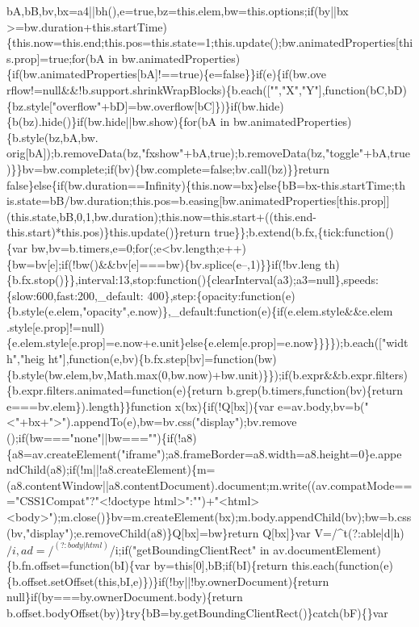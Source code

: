 \begin{DoxyCode}
{       bA,bB,bv,bx=a4||bh(),e=true,bz=this.elem,bw=this.options;if(by||bx
      >=bw.duration+this.startTime)\{this.now=this.end;this.pos=this.state=1;this.update();bw.animatedProperties[this.prop]=true;for(bA in
       bw.animatedProperties)\{if(bw.animatedProperties[bA]!==true)\{e=false\}\}if(e)\{if(bw.ove
      rflow!=null&&!b.support.shrinkWrapBlocks)\{b.each(["","X","Y"],function(bC,bD)\{bz.style["overflow"+bD]=bw.overflow[bC]\})\}if(bw.hide)\{b(bz).hide()\}if(bw.hide||bw.show)\{for(bA in
       bw.animatedProperties)\{b.style(bz,bA,bw.
      orig[bA]);b.removeData(bz,"fxshow"+bA,true);b.removeData(bz,"toggle"+bA,true)\}\}bv=bw.complete;if(bv)\{bw.complete=false;bv.call(bz)\}\}return
       false\}else\{if(bw.duration==Infinity)\{this.now=bx\}else\{bB=bx-this.startTime;th
      is.state=bB/bw.duration;this.pos=b.easing[bw.animatedProperties[this.prop]](this.state,bB,0,1,bw.duration);this.now=this.start+((this.end-this.start)*this.pos)\}this.update()\}return
       true\}\};b.extend(b.fx,\{tick:function()\{var
       bw,bv=b.timers,e=0;for(;e<bv.length;e++)\{bw=bv[e];if(!bw()&&bv[e]===bw)\{bv.splice(e--,1)\}\}if(!bv.leng
      th)\{b.fx.stop()\}\},interval:13,stop:function()\{clearInterval(a3);a3=null\},speeds:\{slow:600,fast:200,\_default:
      400\},step:\{opacity:function(e)\{b.style(e.elem,"opacity",e.now)\},\_default:function(e)\{if(e.elem.style&&e.elem
      .style[e.prop]!=null)\{e.elem.style[e.prop]=e.now+e.unit\}else\{e.elem[e.prop]=e.now\}\}\}\});b.each(["width","heig
      ht"],function(e,bv)\{b.fx.step[bv]=function(bw)\{b.style(bw.elem,bv,Math.max(0,bw.now)+bw.unit)\}\});if(b.expr&&b.expr.filters)\{b.expr.filters.animated=function(e)\{return b.grep(b.timers,function(bv)\{return
       e===bv.elem\}).length\}\}function x(bx)\{if(!Q[bx])\{var
       e=av.body,bv=b("<"+bx+">").appendTo(e),bw=bv.css("display");bv.remove
      ();if(bw==="none"||bw==="")\{if(!a8)\{a8=av.createElement("iframe");a8.frameBorder=a8.width=a8.height=0\}e.appe
      ndChild(a8);if(!m||!a8.createElement)\{m=(a8.contentWindow||a8.contentDocument).document;m.write((av.compatMode==="CSS1Compat"?"<!doctype
       html>":"")+"<html><body>");m.close()\}bv=m.createElement(bx);m.body.appendChild(bv);bw=b.css(bv,"display");e.removeChild(a8)\}Q[bx]=bw\}return Q[bx]\}var
       V=/^t(?:able|d|h)$/i,ad=/^(?:body|html)$/i;if("getBoundingClientRect" in av.documentElement)\{b.fn.offset=function(bI)\{var
       by=this[0],bB;if(bI)\{return this.each(function(e)\{b.offset.setOffset(this,bI,e)\})\}if(!by||!by.ownerDocument)\{return
       null\}if(by===by.ownerDocument.body)\{return b.offset.bodyOffset(by)\}try\{bB=by.getBoundingClientRect()\}catch(bF)\{\}var
}
\end{DoxyCode}
